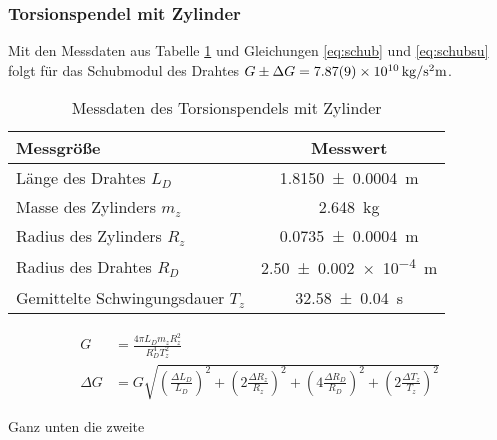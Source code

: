  \subsubsection*{Torsionspendel mit Zylinder}
 
 Mit den Messdaten aus Tabelle \ref{tab:dataTZ} und Gleichungen \ref{eq:schub} und \ref{eq:schubsu} folgt für das Schubmodul  des Drahtes $G\pm \Delta G =\SI{7.87+-0.09e10}{kg \per \second \squared  \metre}$.
 
 
\begin{table}[h]
\centering	
\caption{Messdaten des Torsionspendels mit Zylinder  }
 \begin{tabular}{|l|c|} 
 	\hline 
 Messgröße	& Messwert  \\ 
 	\hline 
 	Länge des Drahtes $L_D$& \SI{1.8150\pm 0.0004 } {m} \\ 
 	\hline 
 	Masse des Zylinders $m_z$& \SI{2.648}{kg} \\ 
 	\hline 
 	Radius des Zylinders $R_z$ & \SI{0.0735 \pm 0.0004}{m}  \\ 
 	\hline 
 	Radius des Drahtes $R_D$ & \SI{2.50+-0.002 e-4} {m} \\ 
 	\hline 
 	Gemittelte Schwingungsdauer $T_z$&\SI{32.58+-0.04}{s}  \\ 
 	\hline 
 \end{tabular} 

	\label{tab:dataTZ}
\end{table} 




\begin{align}
	G&= \frac{4 \pi L_D m_z R_z^2}{R_D^4 T_z^2}
	\label{eq:schub}\\
	\Delta G &= G \sqrt{
		\left( \frac{\Delta L_D}{L_D} \right)^2+
		\left(2 \frac{\Delta R_z}{R_z} \right)^2+
		\left( 4 \frac{\Delta R_D}{R_D} \right)^2+
		\left( 2 \frac{\Delta T_z}{T_z} \right)^2 } \label{eq:schubsu}
\end{align}



Ganz unten die zweite







